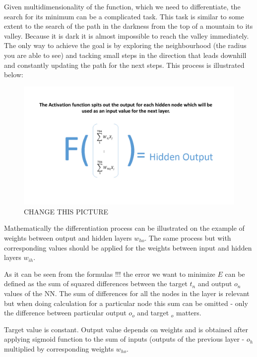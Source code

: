 Given multidimensionality of the function, which we need to differentiate, the search for its minimum can be a complicated task. This task is similar to some extent to the search of the path in the darkness from the top of a mountain to its valley. Because it is dark it is almost impossible to reach the valley immediately. The only way to achieve the goal is by exploring the neighbourhood (the radius you are able to see) and tacking small steps in the direction that leads downhill and constantly updating the path for the next steps. This process is illustrated below:

\begin{figure}[H]
    \includegraphics[width=\linewidth]{pics/activation.jpg}
    \caption{\label{fig:bp} CHANGE THIS PICTURE}
\end{figure}

Mathematically the differentiation process can be illustrated on the example of weights between output and hidden layers \(w_{ho}\). The same process but with corresponding values should be applied for the weights between input and hidden layers \(w_{ih}\).

As it can be seen from the formulas !!! the error we want to minimize \(E\) can be defined as the sum of squared differences between the target \(t_n\) and output \(o_n\) values of the NN. The sum of differences for all the nodes in the layer is relevant but when doing calculation for a particular node this sum can be omitted - only the difference between particular output \(o_o\) and target \(_o\) matters.

Target value is constant. Output value depends on weights and is obtained after applying sigmoid function to the sum of inputs (outputs of the previous layer - \(o_h\) multiplied by corresponding weights \(w_{ho}\).

